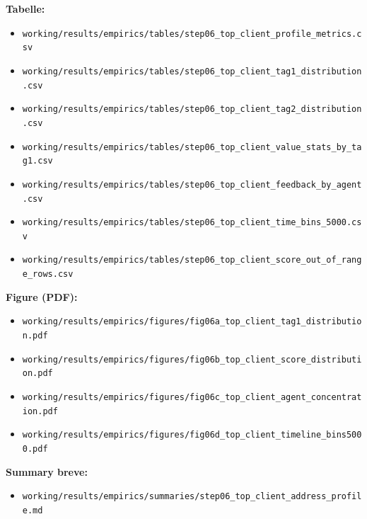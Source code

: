 \documentclass[11pt,a4paper]{article}
\begin{document}
\textbf{Tabelle:}
\begin{itemize}
  \item \texttt{working/results/empirics/tables/step06\_top\_client\_profile\_metrics.csv}
  \item \texttt{working/results/empirics/tables/step06\_top\_client\_tag1\_distribution.csv}
  \item \texttt{working/results/empirics/tables/step06\_top\_client\_tag2\_distribution.csv}
  \item \texttt{working/results/empirics/tables/step06\_top\_client\_value\_stats\_by\_tag1.csv}
  \item \texttt{working/results/empirics/tables/step06\_top\_client\_feedback\_by\_agent.csv}
  \item \texttt{working/results/empirics/tables/step06\_top\_client\_time\_bins\_5000.csv}
  \item \texttt{working/results/empirics/tables/step06\_top\_client\_score\_out\_of\_range\_rows.csv}
\end{itemize}

\textbf{Figure (PDF):}
\begin{itemize}
  \item \texttt{working/results/empirics/figures/fig06a\_top\_client\_tag1\_distribution.pdf}
  \item \texttt{working/results/empirics/figures/fig06b\_top\_client\_score\_distribution.pdf}
  \item \texttt{working/results/empirics/figures/fig06c\_top\_client\_agent\_concentration.pdf}
  \item \texttt{working/results/empirics/figures/fig06d\_top\_client\_timeline\_bins5000.pdf}
\end{itemize}

\textbf{Summary breve:}
\begin{itemize}
  \item \texttt{working/results/empirics/summaries/step06\_top\_client\_address\_profile.md}
\end{itemize}
\end{document}
